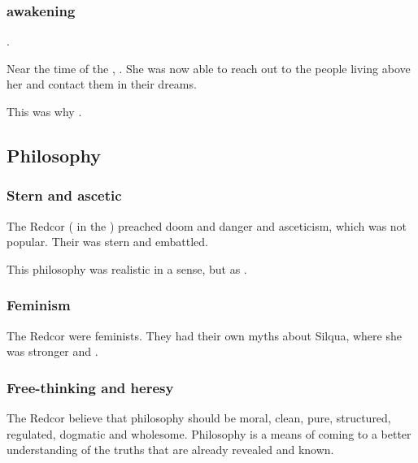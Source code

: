 \subsubsection{\Belzir awakening}
\Belzir {}.

Near the time of the \thirdbanewar, . 
She was now able to reach out to the people living above her and contact them in their dreams. 

This was why . 









\subsection{Philosophy}






\subsubsection{Stern and ascetic}
The Redcor ( in the ) preached doom and danger and asceticism, which was not popular. 
Their \iquin was stern and embattled. 

This philosophy was realistic in a sense, but  as . 





\subsubsection{Feminism}
The Redcor were feminists.
They had their own myths about Silqua, where she was stronger and . 





\subsubsection{Free-thinking and heresy}
The Redcor believe that philosophy should be moral, clean, pure, structured, regulated, dogmatic and wholesome. Philosophy is a means of coming to a better understanding of the truths that are already revealed and known. 

